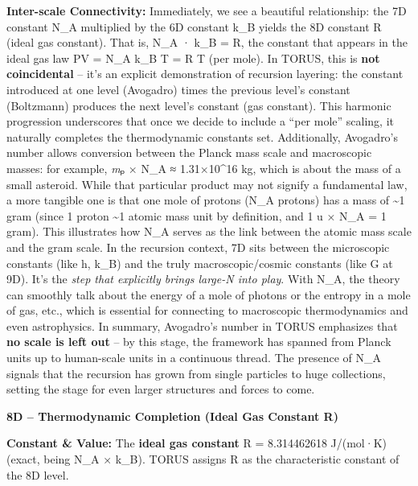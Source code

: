 \documentclass[
]{article}
\begin{document}
\textbf{Inter-scale Connectivity:} Immediately, we see a beautiful
relationship: the 7D constant N\_A multiplied by the 6D constant k\_B
yields the 8D constant R (ideal gas constant)\hspace{0pt}. That is, N\_A
· k\_B = R, the constant that appears in the ideal gas law PV = N\_A
k\_B T = R T (per mole). In TORUS, this is \textbf{not coincidental} --
it's an explicit demonstration of recursion layering: the constant
introduced at one level (Avogadro) times the previous level's constant
(Boltzmann) produces the next level's constant (gas
constant)\hspace{0pt}. This harmonic progression underscores that once
we decide to include a ``per mole'' scaling, it naturally completes the
thermodynamic constants set. Additionally, Avogadro's number allows
conversion between the Planck mass scale and macroscopic masses: for
example, \emph{m}ₚ × N\_A ≈ 1.31×10\^{}16 kg\hspace{0pt}, which is about
the mass of a small asteroid. While that particular product may not
signify a fundamental law, a more tangible one is that one mole of
protons (N\_A protons) has a mass of \textasciitilde1 gram (since 1
proton \textasciitilde1 atomic mass unit by definition, and 1 u × N\_A =
1 gram). This illustrates how N\_A serves as the link between the atomic
mass scale and the gram scale\hspace{0pt}. In the recursion context, 7D
sits between the microscopic constants (like h, k\_B) and the truly
macroscopic/cosmic constants (like G at 9D). It's the \emph{step that
explicitly brings large-N into play}. With N\_A, the theory can smoothly
talk about the energy of a mole of photons or the entropy in a mole of
gas, etc., which is essential for connecting to macroscopic
thermodynamics and even astrophysics. In summary, Avogadro's number in
TORUS emphasizes that \textbf{no scale is left out} -- by this stage,
the framework has spanned from Planck units up to human-scale units in a
continuous thread\hspace{0pt}. The presence of N\_A signals that the
recursion has grown from single particles to huge collections, setting
the stage for even larger structures and forces to come.

\textbf{8D -- Thermodynamic Completion (Ideal Gas Constant R)}

\textbf{Constant \& Value:} The \textbf{ideal gas constant} R =
8.314462618 J/(mol·K) (exact, being N\_A × k\_B)\hspace{0pt}. TORUS
assigns R as the characteristic constant of the 8D level.
\end{document}
